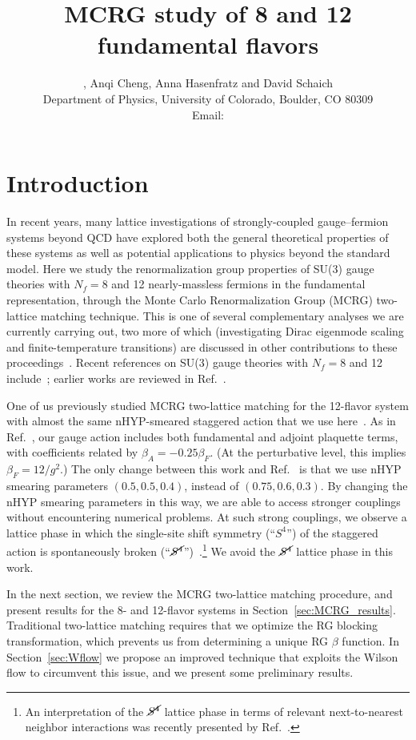 \documentclass{PoS}
\title{MCRG study of 8 and 12 fundamental flavors}
\author{\speaker{Gregory Petropoulos}, Anqi Cheng, Anna Hasenfratz and David Schaich \\
  Department of Physics, University of Colorado, Boulder, CO 80309 \\
  Email: \email{gregory.petropoulos@colorado.edu}
}
\newcommand{\be}{\ensuremath{\beta} }
\newcommand{\Sb}{\ensuremath{\cancel{S^4}} }
\newcommand{\refcite}[1]{Ref.~\cite{#1}}
\newcommand{\secref}[1]{Section~\ref{#1}}
\begin{document}
\section{Introduction} %
In recent years, many lattice investigations of strongly-coupled gauge--fermion systems beyond QCD have explored both the general theoretical properties of these systems as well as potential applications to physics beyond the standard model.
Here we study the renormalization group properties of SU(3) gauge theories with $N_f = 8$ and 12 nearly-massless fermions in the fundamental representation, through the Monte Carlo Renormalization Group (MCRG) two-lattice matching technique.
This is one of several complementary analyses we are currently carrying out, two more of which (investigating Dirac eigenmode scaling and finite-temperature transitions) are discussed in other contributions to these proceedings~\cite{Hasenfratz:2012fp, Schaich:2012fr}.
Recent references on SU(3) gauge theories with $N_f = 8$ and 12 include~\cite{Fodor:2012uw, Fodor:2012et, Aoki:2012eq, Deuzeman:2012ee, Lin:2012iw}; earlier works are reviewed in \refcite{Giedt:2012LAT}.

One of us previously studied MCRG two-lattice matching for the 12-flavor system with almost the same nHYP-smeared staggered action that we use here~\cite{Hasenfratz:2011xn}.
As in \refcite{Hasenfratz:2011xn}, our gauge action includes both fundamental and adjoint plaquette terms, with coefficients related by $\be_A = -0.25\be_F$.
(At the perturbative level, this implies $\be_F = 12 / g^2$.)
The only change between this work and \refcite{Hasenfratz:2011xn} is that we use nHYP smearing parameters $(0.5, 0.5, 0.4)$, instead of $(0.75, 0.6, 0.3)$.
By changing the nHYP smearing parameters in this way, we are able to access stronger couplings without encountering numerical problems.
At such strong couplings, we observe a lattice phase in which the single-site shift symmetry (``$S^4$'') of the staggered action is spontaneously broken (``$\Sb$'')~\cite{Cheng:2011ic, Schaich:2012fr}.\footnote{An interpretation of the \Sb lattice phase in terms of relevant next-to-nearest neighbor interactions was recently presented by \refcite{Deuzeman:2012ee}.}
We avoid the \Sb lattice phase in this work.

In the next section, we review the MCRG two-lattice matching procedure, and present results for the 8- and 12-flavor systems in \secref{sec:MCRG_results}.
Traditional two-lattice matching requires that we optimize the RG blocking transformation, which prevents us from determining a unique RG \be function.
In \secref{sec:Wflow} we propose an improved technique that exploits the Wilson flow to circumvent this issue, and we present some preliminary results.
\end{document}
